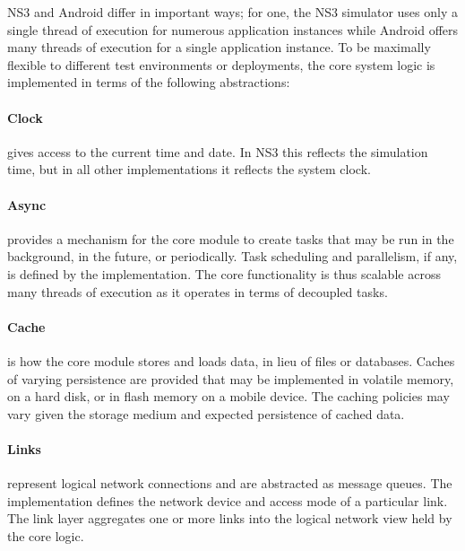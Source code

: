 \documentclass[10pt,twocolumn]{article}
\begin{document}
NS3 and Android differ in important ways; for one, the NS3 simulator uses only a single thread of execution for numerous application instances while Android offers many threads of execution for a single application instance. To be maximally flexible to different test environments or deployments, the core system logic is implemented in terms of the following abstractions:

\paragraph{Clock} gives access to the current time and date. In NS3 this reflects the simulation time, but in all other implementations it reflects the system clock.

\paragraph{Async} provides a mechanism for the core module to create tasks that may be run in the background, in the future, or periodically. Task scheduling and parallelism, if any, is defined by the implementation. The core functionality is thus scalable across many threads of execution as it operates in terms of decoupled tasks.

\paragraph{Cache} is how the core module stores and loads data, in lieu of files or databases. Caches of varying persistence are provided that may be implemented in volatile memory, on a hard disk, or in flash memory on a mobile device. The caching policies may vary given the storage medium and expected persistence of cached data.

\paragraph{Links} represent logical network connections and are abstracted as message queues. The implementation defines the network device and access mode of a particular link. The link layer aggregates one or more links into the logical network view held by the core logic.
\end{document}
